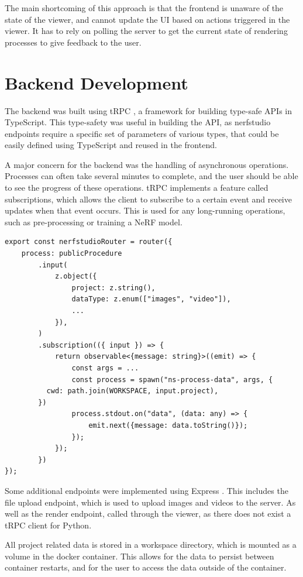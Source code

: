 The main shortcoming of this approach is that the frontend is unaware of the state of the viewer, and cannot update the UI based on actions triggered in the viewer.
It has to rely on polling the server to get the current state of rendering processes to give feedback to the user.

\section{Backend Development}
\label{sec:system:backend}

The backend was built using tRPC \cite{noauthor_trpc_nodate}, a framework for building type-safe APIs in TypeScript.
This type-safety was useful in building the API, as nerfstudio endpoints require a specific set of parameters of various types, that could be easily defined using TypeScript and reused in the frontend.

A major concern for the backend was the handling of asynchronous operations.
Processes can often take several minutes to complete, and the user should be able to see the progress of these operations.
tRPC implements a feature called subscriptions, which allows the client to subscribe to a certain event and receive updates when that event occurs.
This is used for any long-running operations, such as pre-processing or training a NeRF model.

\begin{lstlisting}[style=ES6, caption=Example tRPC endpoint for Pre-Processing]
export const nerfstudioRouter = router({
	process: publicProcedure
		.input(
			z.object({
				project: z.string(),
				dataType: z.enum(["images", "video"]),
				...
			}),
		)
		.subscription(({ input }) => {
			return observable<{message: string}>((emit) => {
				const args = ...
				const process = spawn("ns-process-data", args, {
          cwd: path.join(WORKSPACE, input.project),
        })
				process.stdout.on("data", (data: any) => {
					emit.next({message: data.toString()});
				});
			});
		})
});
\end{lstlisting}

Some additional endpoints were implemented using Express \cite{noauthor_express_nodate}.
This includes the file upload endpoint, which is used to upload images and videos to the server.
As well as the render endpoint, called through the viewer, as there does not exist a tRPC client for Python.

All project related data is stored in a workspace directory, which is mounted as a volume in the docker container.
This allows for the data to persist between container restarts, and for the user to access the data outside of the container.

